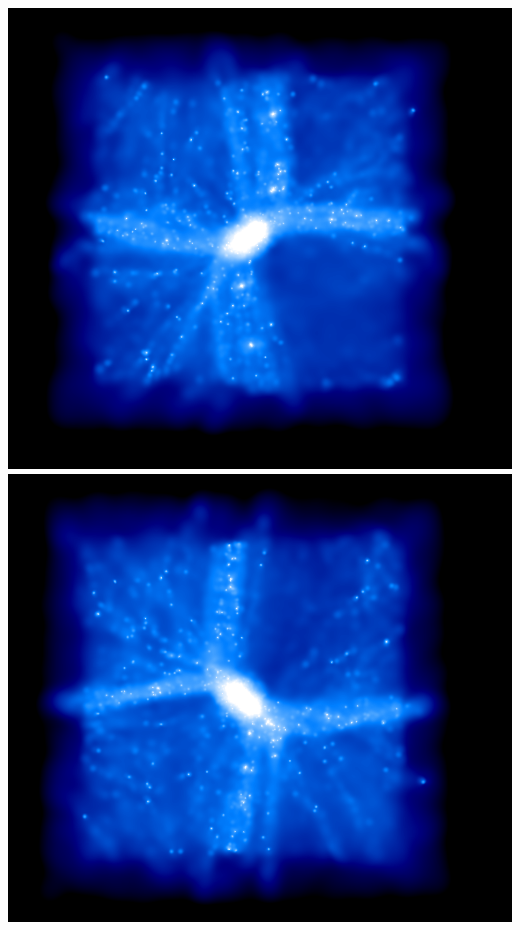 \includegraphics[scale=0.2]{r256/drd5_r256_2/1.png} 
\includegraphics[scale=0.2]{r256/drd5_r256_2/2.png} 

